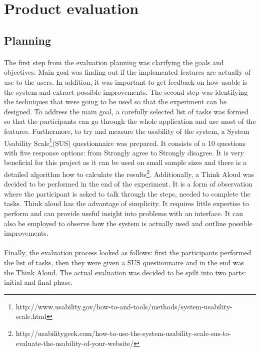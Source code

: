 \documentclass{l4proj}
\begin{document}
\section{Product evaluation}

\subsection{Planning}
\paragraph{}
The first step from the evaluation planning was clarifying the goals and objectives. Main goal was finding out if the implemented features are actually of use to the users. In addition, it was important to get feedback on how usable is the system and extract possible improvements. The second step was identifying the techniques that were going to be used so that the experiment can be designed. To address the main goal,  a carefully selected list of tasks was formed so that the participants can go through the whole application and use most of the features. Furthermore, to try and measure the usability of the system, a System Usability Scale\footnote{http://www.usability.gov/how-to-and-tools/methods/system-usability-scale.html}(SUS) questionnaire was prepared. It consists of a 10 questions with five response options: from Strongly agree to Strongly disagree. It is very beneficial for this project as it can be used on small sample sizes and there is a detailed algorithm how to calculate the results\footnote{http://usabilitygeek.com/how-to-use-the-system-usability-scale-sus-to-evaluate-the-usability-of-your-website/}. Additionally, a Think Aloud was decided to be performed in the end of the experiment. It is a form of observation where the participant is asked to talk through the steps, needed to complete the tasks\cite{hci}. Think aloud has the advantage of simplicity. It requires little expertise to perform and can provide useful insight into problems with an interface. It can also be employed to observe how the system is actually used and outline possible improvements.
\paragraph{} 
 Finally, the evaluation process looked as follows: first the participants performed the list of tasks, then they were given a SUS questionnaire and in the end was the Think Aloud. The actual evaluation was decided to be spilt into two parts: initial and final phase.
\end{document}
